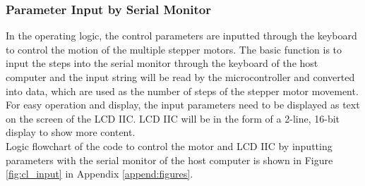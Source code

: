 \subsubsection{Parameter Input by Serial Monitor}
In the operating logic, the control parameters are inputted through the keyboard to control the motion of the 
multiple stepper motors. The basic function is to input the steps into the serial monitor through the keyboard 
of the host computer and the input string will be read by the microcontroller and converted into data, which are 
used as the number of steps of the stepper motor movement. For easy operation and display, the input parameters 
need to be displayed as text on the screen of the LCD IIC. LCD IIC will be in the form of a 2-line, 16-bit display 
to show more content. \\
Logic flowchart of the code to control the motor and LCD IIC by inputting parameters with the serial monitor of 
the host computer is shown in Figure \ref{fig:cl_input} in Appendix \ref{append:figures}.
